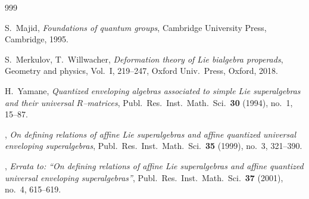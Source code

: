 \documentclass[12pt,reqno,twoside,a4paper]{amsart}
\numberwithin{equation}{section}
\theoremstyle{definition}
\newtheorem{free text}[lema]{}
\theoremstyle{remark}
\theoremstyle{plain}
\begin{document}
\begin{thebibliography}{999}
\vskip7pt

  {\sc S.\ Majid},
  \textit{Foundations of quantum groups},  Cambridge University Press, Cambridge, 1995.

\vskip7pt

  {\sc S.\ Merkulov},  {\sc T.\ Willwacher},
   {\it Deformation theory of Lie bialgebra properads},
   Geometry and physics, Vol.\ I, 219--247, Oxford Univ.\ Press, Oxford, 2018.

\vskip7pt

  {\sc H.\ Yamane},  \textit{Quantized enveloping algebras associated to simple Lie superalgebras and their universal  $ R $--matrices},  Publ.\ Res.\ Inst.\ Math.\ Sci.\  {\bf 30}  (1994), no.\ 1, 15--87.

\vskip7pt

  \bysame ,  \textit{On defining relations of affine Lie superalgebras and affine quantized universal enveloping superalgebras},  Publ.\ Res.\ Inst.\ Math.\ Sci.\  {\bf 35}  (1999), no.\ 3, 321--390.

\vskip7pt

  \bysame ,  \textit{Errata to: ``On defining relations of affine Lie superalgebras and affine quantized universal enveloping superalgebras''},  Publ.\ Res.\ Inst.\ Math.\ Sci.\  {\bf 37}  (2001), no.\ 4, 615--619.

%
\end{thebibliography}

\vskip21pt
\end{document}
